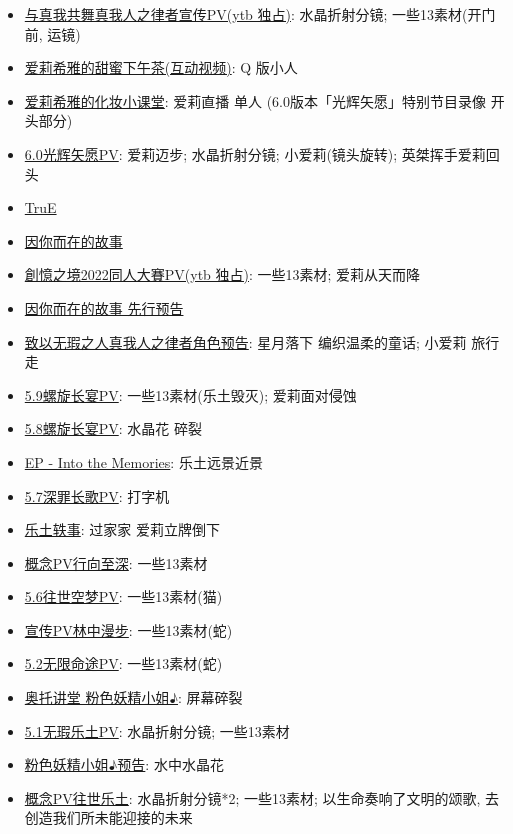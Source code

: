 \documentclass[a4paper]{article}
\begin{document}
\begin{itemize}
    \item \href{https://www.youtube.com/watch?v=mj-lnw1XlN0}{与真我共舞真我人之律者宣传PV(ytb 独占)}: 水晶折射分镜; 一些13素材(开门前, 运镜)
    \item \href{https://www.bilibili.com/video/BV1Ta411Z7KE/}{爱莉希雅的甜蜜下午茶(互动视频)}: Q 版小人
    \item \href{https://www.bilibili.com/video/BV12T411w7CN/}{爱莉希雅的化妆小课堂}: 爱莉直播 单人 (6.0版本「光辉矢愿」特别节目录像 开头部分)
    \item \href{https://www.bilibili.com/video/BV1Mg411k7U5/}{6.0光辉矢愿PV}: 爱莉迈步; 水晶折射分镜; 小爱莉(镜头旋转); 英桀挥手爱莉回头
    \item \href{https://www.bilibili.com/video/BV1sg411y7cZ/}{TruE}
    \item \href{https://www.bilibili.com/video/BV1fY4y1F7GL/}{因你而在的故事}
    \item \href{https://www.youtube.com/watch?v=psC2zgpPuPQ}{創憶之境2022同人大賽PV(ytb 独占)}: 一些13素材; 爱莉从天而降
    \item \href{https://www.bilibili.com/video/BV1Ee4y1D7ci/}{因你而在的故事 先行预告}
    \item \href{https://www.bilibili.com/video/BV1DS4y1t7rs/}{致以无瑕之人真我人之律者角色预告}: 星月落下 编织温柔的童话; 小爱莉 旅行 走
    \item \href{https://www.bilibili.com/video/BV1Ra411X7Hr/}{5.9螺旋长宴PV}: 一些13素材(乐土毁灭); 爱莉面对侵蚀
    \item \href{https://www.bilibili.com/video/BV1sP4y1F7iQ/}{5.8螺旋长宴PV}: 水晶花 碎裂
    \item \href{https://www.bilibili.com/video/BV18Y4y1Y7Hc/}{EP - Into the Memories}: 乐土远景近景
    \item \href{https://www.bilibili.com/video/BV1nY411j74v/}{5.7深罪长歌PV}: 打字机
    \item \href{https://www.bilibili.com/video/BV1fr4y1n787/}{乐土轶事}: 过家家 爱莉立牌倒下
    \item \href{https://www.bilibili.com/video/BV1wF411b7wo/}{概念PV行向至深}: 一些13素材
    \item \href{https://www.bilibili.com/video/BV1KL4y137Jb/}{5.6往世空梦PV}: 一些13素材(猫)
    \item \href{https://www.bilibili.com/video/BV1F341127NT/}{宣传PV林中漫步}: 一些13素材(蛇)
    \item \href{https://www.bilibili.com/video/BV1V44y1b7cf/}{5.2无限命途PV}: 一些13素材(蛇)
    \item \href{https://www.bilibili.com/video/BV1Ny4y1573D/}{奥托讲堂 粉色妖精小姐♪}: 屏幕碎裂
    \item \href{https://www.bilibili.com/video/BV1iP4y1W7Kk/}{5.1无瑕乐土PV}: 水晶折射分镜; 一些13素材
    \item \href{https://www.bilibili.com/video/BV1Nw411R7bU/}{粉色妖精小姐♪预告}: 水中水晶花
    \item \href{https://www.bilibili.com/video/BV1T64y1X7mY/}{概念PV往世乐土}: 水晶折射分镜*2; 一些13素材; 以生命奏响了文明的颂歌, 去创造我们所未能迎接的未来
\end{itemize}
\end{document}
